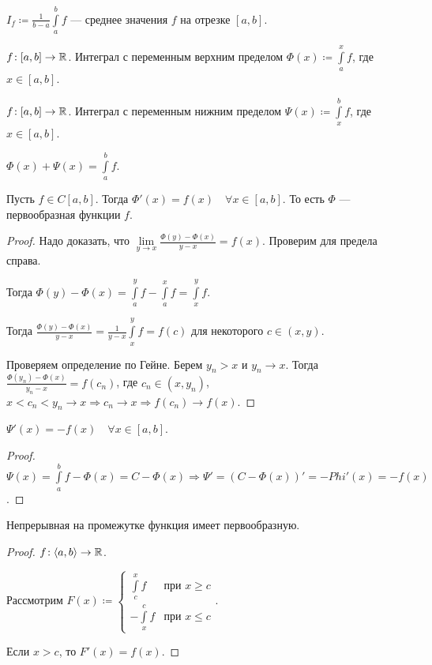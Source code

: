 \begin{definition}
    $I_f \coloneqq \frac{1}{b-a} \int\limits_a^b f$ --- среднее значения $f$ на отрезке  $[a, b]$.
\end{definition}
\begin{definition}
    $f\!: [a, b] \to \mathbb{R}$. Интеграл с переменным верхним пределом  $\Phi(x) \coloneqq \int\limits_a^x f$, где  $x \in [a, b]$.
\end{definition}
\begin{definition}
    $f\!: [a, b] \to \mathbb{R}$. Интеграл с переменным нижним пределом  $\Psi(x) \coloneqq \int\limits_x^b f$, где  $x \in [a, b]$.
\end{definition}
\begin{remark}
    $\Phi(x) + \Psi(x) = \int\limits_a^b f$.
\end{remark}
\begin{theorem}
    Пусть  $f \in C[a, b]$. Тогда  $\Phi'(x) = f(x)\quad  \forall x \in[a, b]$. То есть  $\Phi$ --- первообразная функции  $f$.
\end{theorem}
\begin{proof}
    Надо доказать, что $\lim\limits_{y \to x} \frac{\Phi(y) - \Phi(x)}{y-x} = f(x)$. Проверим для предела справа. 

    Тогда $\Phi(y) - \Phi(x) = \int\limits_a^y f - \int\limits_a^x f = \int\limits_x^y f$.

    Тогда  $\frac{\Phi(y) - \Phi(x)}{y-x}=\frac{1}{y-x}\int\limits_x^y f = f(c)$ для некоторого $c \in (x, y)$.

    Проверяем определение по Гейне. Берем  $y_n > x$ и  $y_n \to x$. Тогда  $\frac{\Phi(y_n)-\Phi(x)}{y_n - x} = f(c_n)$, где $c_n \in (x, y_n)$,  $x < c_n < y_n \to x \Rightarrow c_n \to x \Rightarrow f(c_n) \to f(x)$.
\end{proof}
\begin{consequence}
    $\Psi'(x) = -f(x)\quad \forall x\in [a, b]$.
\end{consequence}
\begin{proof}
    $\Psi(x) = \int\limits_a^b f - \Phi(x) = C - \Phi(x) \Rightarrow \Psi' = (C - \Phi(x))' = -Phi'(x) = -f(x)$.
\end{proof}
\begin{theorem}
    Непрерывная на промежутке функция имеет первообразную.
\end{theorem}
\begin{proof}
    $f\!: \langle a, b \rangle \to \mathbb{R}$. 

    Рассмотрим  $F(x) \coloneqq \begin{cases} \int\limits_c^x f & \text{при } x \ge c \\ -\int\limits_x^c f & \text{при } x \le c \end{cases}$.

    Если $x > c$, то  $F'(x) = f(x)$. 
\end{proof}

